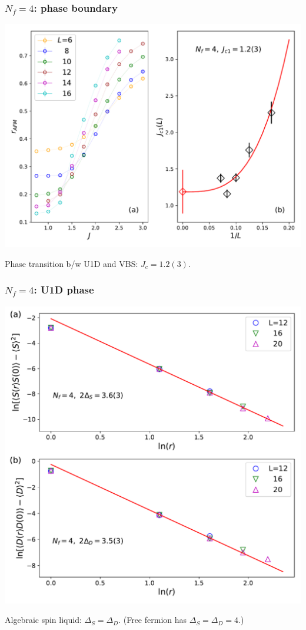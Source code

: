 \documentclass[xcolor=table, 10pt, aspectratio=169]{beamer}
\begin{document}
\begin{frame}
  \frametitle{$N_f=4$: phase boundary}
  \begin{center}
    \includegraphics[width=.8\textwidth]{n4rvbs}
  \end{center}
  Phase transition b/w U1D and VBS: $J_c=1.2(3)$.
\end{frame}

\begin{frame}
  \frametitle{$N_f=4$: U1D phase}
  \begin{center}
    \includegraphics[width=.5\textwidth]{n4decay}
  \end{center}
  Algebraic spin liquid: $\Delta_S = \Delta_D$.
  (Free fermion has $\Delta_S=\Delta_D = 4$.)
\end{frame}
\end{document}

